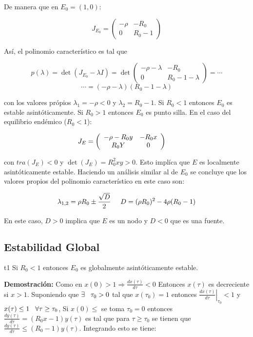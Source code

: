 \documentclass[10pt,oneside]{article}
\theoremstyle{definition}
\begin{document}
\begin{multicols}{2}
    De manera que en $E_0=(1,0):$
    
    $$J_{E_0}=\left(\begin{array}{cc}
       -\rho  & -R_0 \\
       0 & R_0-1
    \end{array}\right)$$

    Así, el polinomio característico es tal que

    $$p(\lambda)=\det (J_{E_0}-\lambda I)=\det \left(\begin{array}{cc}
       -\rho-\lambda  & -R_0 \\
       0 & R_0-1-\lambda
    \end{array}\right)=\cdots$$
    $$\cdots=(-\rho-\lambda)(R_0-1-\lambda)$$

    con los valores própios $\lambda_1=-\rho<0$ y $\lambda_2=R_0-1$. Si $R_0<1$ entonces $E_0$ es estable asintóticamente. Si $R_0>1$ entonces  $E_0$ es punto silla. \newline En el caso del equilibrio endémico ($R_0<1$):
    
    $$J_{E}=\left(\begin{array}{cc}
       -\rho-R_0y  & -R_0x \\
       R_0Y & 0
    \end{array}\right)\hspace{0.5cm}$$

    con $tra(J_{E})<0$ y $\det(J_E)=R_0^2xy>0$. Esto implíca que $E$ es localmente asintóticamente estable. Haciendo un análisis similar al de $E_0$ se concluye que los valores propios del polinomio característico en este caso son:

    $$\lambda_{1,2}=\rho R_0 \pm \frac{\sqrt{D}}{2}\hspace{0.5cm}  D=(\rho R_0)^2-4\rho(R_0-1)$$

    En este caso, $D>0$ implica que $E$ es un nodo y $D<0$ que es una fuente.

    \subsection{Estabilidad Global}

    \begin{theorems}{}{t1}
        Si $R_0<1$ entonces $E_0$ es globalmente asintóticamente estable.
    \end{theorems}

    \textbf{Demostración:} Como en $x(0)>1\Rightarrow\displaystyle{\frac{dx(\tau)}{d \tau}<0}$ Entonces $x(\tau)$ es decreciente si $x>1$. Suponiendo que $\exists\hspace{0.3cm} \tau_0>0$ tal que $x(\tau_0)=1$ entonces $\left.\frac{dx(\tau)}{d \tau}\right\vert _{\tau_0}<1$ y $x(\tau)\leq1 \hspace{0.3cm}\forall \tau\geq \tau_0$, Si $x(0)\leq$ se toma $\tau_0=0$ entonces $\frac{dy(\tau)}{d\tau}=(R_0x-1)y(\tau)$ es tal que para $\tau\geq\tau_0$ se tienen que $\frac{dy(\tau)}{d\tau}\leq(R_0-1)y(\tau)$. Integrando esto se tiene:


\end{multicols}
\end{document}
